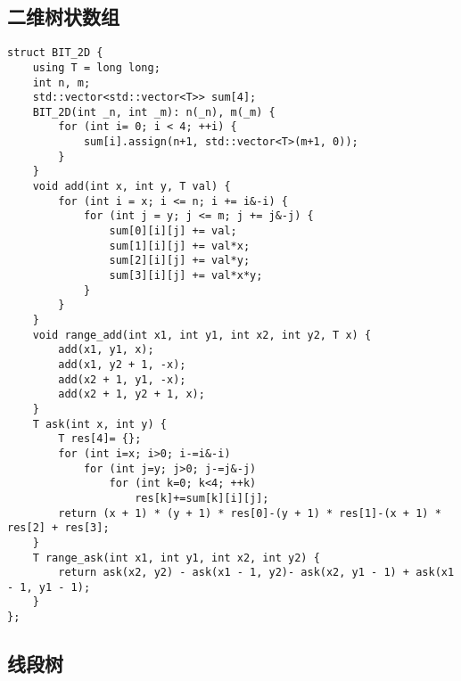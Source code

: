 \subsection{二维树状数组}
\begin{lstlisting}
struct BIT_2D {
    using T = long long;
    int n, m;
    std::vector<std::vector<T>> sum[4];
    BIT_2D(int _n, int _m): n(_n), m(_m) {
        for (int i= 0; i < 4; ++i) {
            sum[i].assign(n+1, std::vector<T>(m+1, 0));
        }
    }
    void add(int x, int y, T val) {
        for (int i = x; i <= n; i += i&-i) {
            for (int j = y; j <= m; j += j&-j) {
                sum[0][i][j] += val;
                sum[1][i][j] += val*x;
                sum[2][i][j] += val*y;
                sum[3][i][j] += val*x*y;
            }
        }
    }
    void range_add(int x1, int y1, int x2, int y2, T x) {
        add(x1, y1, x);
        add(x1, y2 + 1, -x);
        add(x2 + 1, y1, -x);
        add(x2 + 1, y2 + 1, x);
    }
    T ask(int x, int y) {
        T res[4]= {};
        for (int i=x; i>0; i-=i&-i)
            for (int j=y; j>0; j-=j&-j)
                for (int k=0; k<4; ++k)
                    res[k]+=sum[k][i][j];
        return (x + 1) * (y + 1) * res[0]-(y + 1) * res[1]-(x + 1) * res[2] + res[3];
    }
    T range_ask(int x1, int y1, int x2, int y2) {
        return ask(x2, y2) - ask(x1 - 1, y2)- ask(x2, y1 - 1) + ask(x1 - 1, y1 - 1);
    }
};
\end{lstlisting}



\subsection{线段树}
